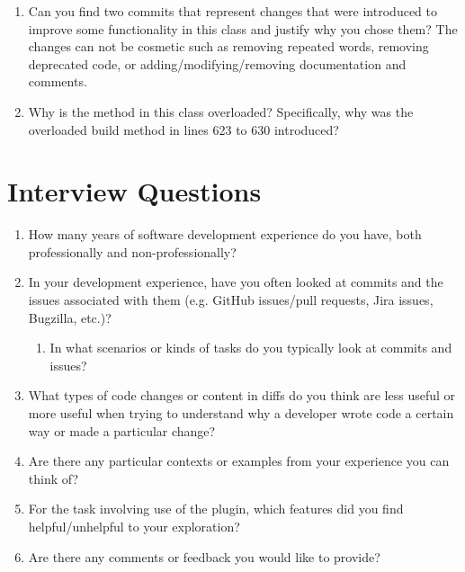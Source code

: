 \begin{enumerate}
    \item Can you find two commits that represent changes that were introduced to improve some functionality in this class and justify why you chose them? The changes can not be cosmetic such as removing repeated words, removing deprecated code, or adding/modifying/removing documentation and comments. 
    \item Why is the  method in this class overloaded? Specifically, why was the overloaded build method in lines 623 to 630 introduced?
\end{enumerate}

\section{Interview Questions}
\label{sec:Interview-Questions}

\begin{enumerate}
    \item How many years of software development experience do you have, both professionally and non-professionally?
    \item In your development experience, have you often looked at commits and the issues associated with them (e.g. GitHub issues/pull requests, Jira issues, Bugzilla, etc.)?
        \begin{enumerate}
            \item In what scenarios or kinds of tasks do you typically look at commits and issues?
        \end{enumerate}
    \item What types of code changes or content in diffs do you think are less useful or more useful when trying to understand why a developer wrote code a certain way or made a particular change? 
    \item Are there any particular contexts or examples from your experience you can think of?
    \item For the task involving use of the plugin, which features did you find helpful/unhelpful to your exploration?
    \item Are there any comments or feedback you would like to provide?
\end{enumerate}

\endinput

This would be any supporting material not central to the dissertation.
For example:
\begin{itemize}
\item additional details of methodology and/or data;
\item diagrams of specialized equipment developed.;
\item copies of questionnaires and survey instruments.
\end{itemize}